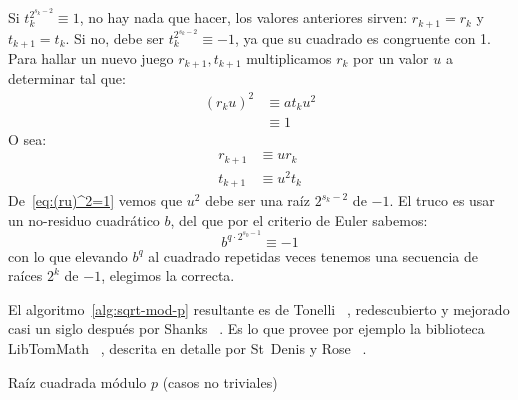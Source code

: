   Si \(t_k^{2^{s_k - 2}} \equiv 1\),
  no hay nada que hacer,
  los valores anteriores sirven:
  \(r_{k + 1} = r_k\) y \(t_{k + 1} = t_k\).
  Si no,
  debe ser \(t_k^{2^{s_k - 2}} \equiv -1\),
  ya que su cuadrado es congruente con \num{1}.
  Para hallar un nuevo juego \(r_{k + 1}, t_{k + 1}\)
  multiplicamos \(r_k\) por un valor \(u\) a determinar
  tal que:
  \begin{align}
    (r_k u)^2
      &\equiv a t_k u^2 \\
      &\equiv 1 \label{eq:(ru)^2=1}
  \end{align}
  O sea:
  \begin{align*}
    r_{k + 1}
      &\equiv u r_k \\
    t_{k + 1}
      &\equiv u^2 t_k
  \end{align*}
  De~\eqref{eq:(ru)^2=1}
  vemos que \(u^2\) debe ser una raíz \(2^{s_k - 2}\) de \(-1\).
  El truco es usar un no\nobreakdash-residuo cuadrático \(b\),
  del que por el criterio de Euler sabemos:
  \begin{equation*}
    b^{q \cdot 2^{s_0 - 1}}
      \equiv -1
  \end{equation*}
  con lo que elevando \(b^q\) al cuadrado repetidas veces
  tenemos una secuencia de raíces \(2^k\) de \(-1\),
  elegimos la correcta.

  El algoritmo~\ref{alg:sqrt-mod-p} resultante es de Tonelli~%
     \cite{tonelli91:_bemerkung_aufloesung_congruenzen},
  redescubierto y mejorado casi un siglo después por Shanks~%
    \cite{shanks72:_five_number_theoretic_algorithms}.
  Es lo que provee por ejemplo la biblioteca LibTomMath~%
    \cite{teamtom19:_libtommath_1.2.0},
  descrita en detalle por St~Denis y Rose~%
    \cite{st_denis06:_bignum_math}.
  \begin{algorithm}
    \DontPrintSemicolon\Indp

    \caption{Raíz cuadrada módulo \(p\)
             (casos no triviales)}
    \label{alg:sqrt-mod-p}
  \end{algorithm}

